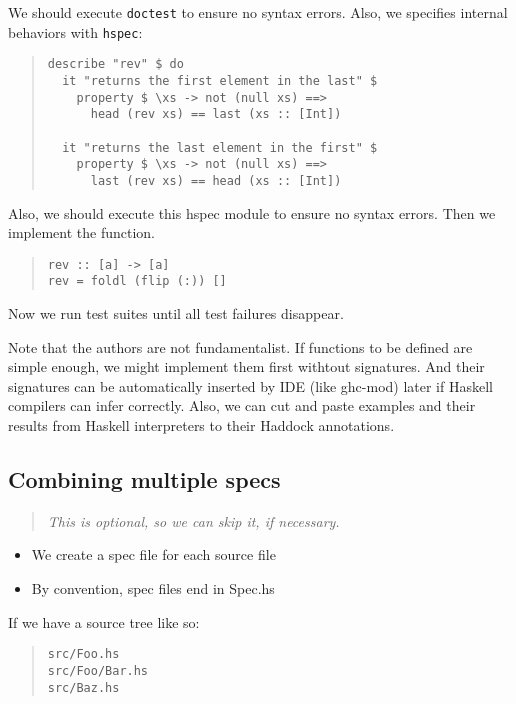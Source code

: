 \documentclass[preprint]{sigplanconf}
\begin{document}
\noindent We should execute {\tt doctest} to ensure no syntax errors.
Also, we specifies internal behaviors with {\tt hspec}:

\begin{quote}
\small
\begin{verbatim}
describe "rev" $ do
  it "returns the first element in the last" $
    property $ \xs -> not (null xs) ==>
      head (rev xs) == last (xs :: [Int])

  it "returns the last element in the first" $
    property $ \xs -> not (null xs) ==>
      last (rev xs) == head (xs :: [Int])
\end{verbatim}
\end{quote}

\noindent Also, we should execute this hspec module
to ensure no syntax errors.
Then we implement the function.

\begin{quote}
\small
\begin{verbatim}
rev :: [a] -> [a]
rev = foldl (flip (:)) []
\end{verbatim}
\end{quote}

\noindent Now we run test suites until
all test failures disappear.

Note that the authors are not fundamentalist.
If functions to be defined are simple enough,
we might implement them first withtout signatures.
And their signatures can be automatically
inserted by IDE (like ghc-mod) later
if Haskell compilers can infer correctly.
Also, we can cut and paste examples and their results
from Haskell interpreters to their Haddock annotations.

\subsection{Combining multiple specs}

\begin{quote}
\emph{This is optional, so we can skip it, if necessary.}
\end{quote}

\begin{itemize}
\item We create a spec file for each source file
\item By convention, spec files end in Spec.hs
\end{itemize}

\noindent If we have a source tree like so:

\begin{quote}
\small
\begin{verbatim}
src/Foo.hs
src/Foo/Bar.hs
src/Baz.hs
\end{verbatim}
\end{quote}
\end{document}
